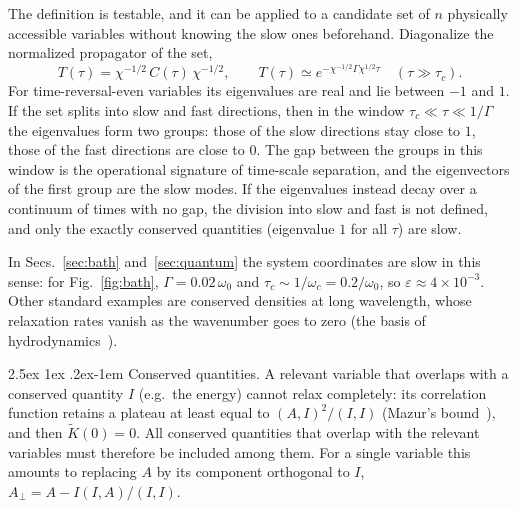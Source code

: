 \documentclass[10pt,a4paper]{article}
\makeatletter
\renewcommand{\paragraph}{\@startsection{paragraph}{4}{\z@}%
  {2.5ex \@plus 1ex \@minus .2ex}{-1em}%
  {\normalfont\fontsize{14pt}{17pt}\selectfont\bfseries}}
\newcommand{\sprod}[2]{\left(#1 , #2\right)}
\makeatother
\begin{document}
The definition is testable, and it can be applied to a candidate set of $ n $ physically accessible variables without knowing the slow ones beforehand.
Diagonalize the normalized propagator of the set,
\begin{equation}
  T(\tau) = \chi^{-1/2} \, C(\tau) \, \chi^{-1/2} ,
  \qquad
  T(\tau) \simeq e^{-\chi^{-1/2}\Gamma\chi^{1/2} \tau} \quad (\tau \gg \tau_c) .
  \label{eq:propagator}
\end{equation}
For time-reversal-even variables its eigenvalues are real and lie between $ -1 $ and $ 1 $.
If the set splits into slow and fast directions, then in the window $ \tau_c \ll \tau \ll 1/\Gamma $ the eigenvalues form two groups: those of the slow directions stay close to $ 1 $, those of the fast directions are close to $ 0 $.
The gap between the groups in this window is the operational signature of time-scale separation, and the eigenvectors of the first group are the slow modes.
If the eigenvalues instead decay over a continuum of times with no gap, the division into slow and fast is not defined, and only the exactly conserved quantities (eigenvalue $ 1 $ for all $ \tau $) are slow.

In Secs.~\ref{sec:bath} and~\ref{sec:quantum} the system coordinates are slow in this sense: for Fig.~\ref{fig:bath}, $ \Gamma = 0.02\,\omega_0 $ and $ \tau_c \sim 1/\omega_c = 0.2/\omega_0 $, so $ \varepsilon \approx 4\times 10^{-3} $.
Other standard examples are conserved densities at long wavelength, whose relaxation rates vanish as the wavenumber goes to zero (the basis of hydrodynamics~\cite{Forster1975}).

\paragraph{Conserved quantities.}
A relevant variable that overlaps with a conserved quantity $ I $ (e.g.\ the energy) cannot relax completely: its correlation function retains a plateau at least equal to $ \sprod{A}{I}^2/\sprod{I}{I} $ (Mazur's bound~\cite{Mazur1969}), and then $ \tilde K(0) = 0 $.
All conserved quantities that overlap with the relevant variables must therefore be included among them.
For a single variable this amounts to replacing $ A $ by its component orthogonal to $ I $, $ A_\perp = A - I \sprod{I}{A}/\sprod{I}{I} $.
\end{document}
